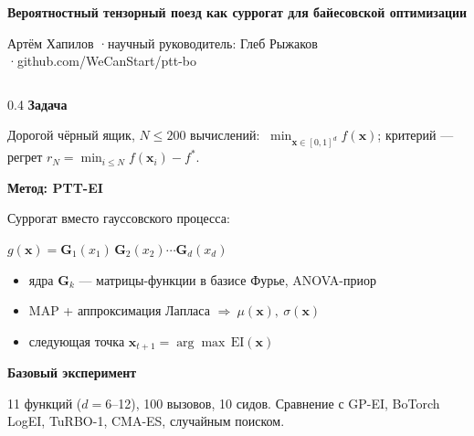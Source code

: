 \documentclass[aspectratio=169,10pt]{beamer}
\newcommand{\x}{\mathbf x}
\newcommand{\G}{\mathbf G}
\newcommand{\hd}[1]{{\color{accent}\bfseries #1}\par\vspace{1pt}}
\begin{document}
\begin{frame}[t]
\vspace{-0.15cm}
{\normalsize\bfseries Вероятностный тензорный поезд как суррогат для байесовской оптимизации\par}
\vspace{1pt}
{\scriptsize\color{muted}Артём Хапилов \quad·\quad научный руководитель: Глеб Рыжаков \quad·\quad github.com/WeCanStart/ptt-bo\par}
\vspace{0.12cm}
\begin{columns}[T,onlytextwidth]
\begin{column}{0.4\textwidth}
\footnotesize
\hd{Задача}
Дорогой чёрный ящик, $N\le200$ вычислений:
$\ \min_{\x\in[0,1]^d} f(\x)$; критерий — регрет $r_N=\min_{i\le N}f(\x_i)-f^*$.\par\vspace{3pt}
\hd{Метод: PTT-EI}
Суррогат вместо гауссовского процесса:\par\vspace{1pt}
\centerline{$g(\x)=\G_1(x_1)\,\G_2(x_2)\cdots\G_d(x_d)$}\vspace{-2pt}
\begin{itemize}\setlength\itemsep{1pt}
\item ядра $\G_k$ — матрицы-функции в базисе Фурье, ANOVA-приор
\item MAP + аппроксимация Лапласа $\Rightarrow\ \mu(\x),\ \sigma(\x)$
\item следующая точка $\x_{t+1}=\arg\max\,\mathrm{EI}(\x)$
\end{itemize}
\vspace{2pt}
\hd{Базовый эксперимент}
11 функций ($d=6$–12), 100 вызовов, 10 сидов. Сравнение с GP-EI, BoTorch LogEI, TuRBO-1, CMA-ES, случайным поиском.
\vspace{4pt}


\end{column}
\end{columns}
\end{frame}
\end{document}
